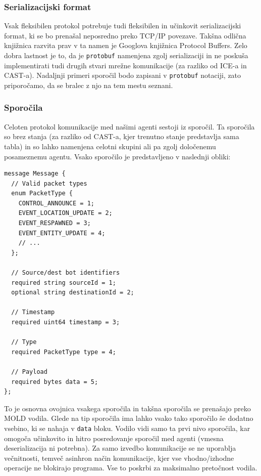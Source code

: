 \documentclass[a4paper,10pt]{article}
\begin{document}
\subsubsection{Serializacijski format}

Vsak fleksibilen protokol potrebuje tudi fleksibilen in učinkovit serializacijski format, ki se bo prenašal neposredno preko TCP/IP povezave. Takšna odlična knjižnica razvita prav v ta namen je Googlova knjižnica Protocol Buffers. Zelo dobra lastnost je to, da je \texttt{protobuf} namenjena zgolj serializaciji in ne poskuša implementirati tudi drugih stvari mrežne komunikacije (za razliko od ICE-a in CAST-a). Nadaljnji primeri sporočil bodo zapisani v \texttt{protobuf} notaciji, zato priporočamo, da se bralec z njo na tem mestu seznani.

\subsubsection{Sporočila}

Celoten protokol komunikacije med našimi agenti sestoji iz sporočil. Ta sporočila so brez stanja (za razliko od CAST-a, kjer trenutno stanje predstavlja sama tabla) in so lahko namenjena celotni skupini ali pa zgolj določenemu posameznemu agentu. Vsako sporočilo je predstavljeno v naslednji obliki:

\begin{verbatim}
message Message {
  // Valid packet types
  enum PacketType {
    CONTROL_ANNOUNCE = 1;
    EVENT_LOCATION_UPDATE = 2;
    EVENT_RESPAWNED = 3;
    EVENT_ENTITY_UPDATE = 4;
    // ...
  };
  
  // Source/dest bot identifiers
  required string sourceId = 1;
  optional string destinationId = 2;
  
  // Timestamp
  required uint64 timestamp = 3;
  
  // Type
  required PacketType type = 4;
  
  // Payload
  required bytes data = 5;
};
\end{verbatim}

\noindent
To je osnovna ovojnica vsakega sporočila in takšna sporočila se prenašajo preko MOLD vodila. Glede na tip sporočila ima lahko vsako tako sporočilo še dodatno vsebino, ki se nahaja v \texttt{data} bloku. Vodilo vidi samo ta prvi nivo sporočila, kar omogoča učinkovito in hitro posredovanje sporočil med agenti (vmesna deserializacija ni potrebna). Za samo izvedbo komunikacije se ne uporablja večnitnosti, temveč asinhron način komunikacije, kjer vse vhodno/izhodne operacije ne blokirajo programa. Vse to poskrbi za maksimalno pretočnost vodila.
\end{document}
